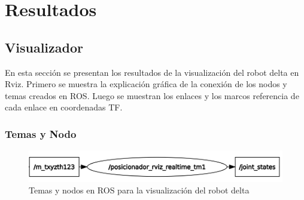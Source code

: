 \chapter{Resultados}\label{CAP7}

\section{Visualizador}
        En esta sección se presentan los resultados de la visualización del robot delta en Rviz. Primero se muestra la explicación gráfica de la conexión de los nodos y temas creados en ROS. Luego se muestran los enlaces y los marcos referencia de cada enlace en coordenadas TF. 

    \subsection{Temas y Nodo}
    
    \begin{figure}[h]
            \centering
            \includegraphics[width=1.0\linewidth]{Main/Chapter7/Images7/nodo_1.png}
            \caption{Temas y nodos en ROS para la visualización del robot delta}
            \label{f:cap7_rviz1111}
        \end{figure} 
        
